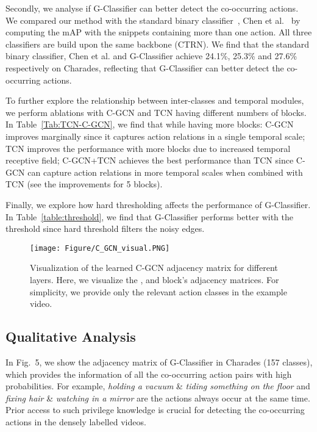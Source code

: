 \documentclass{bmvc2k}
\begin{document}
{Secondly, we analyse if G-Classifier can better detect the co-occurring actions. We compared our method with the standard binary classifier~\cite{superevent}, Chen et al.~\cite{chen2019multi} by computing the mAP with the snippets containing more than one action. 
All three classifiers are build upon the same backbone (CTRN). We find that the standard binary classifier, Chen et al. and G-Classifier achieve 24.1\%, 25.3\% and 27.6\% respectively on Charades, reflecting that G-Classifier can better detect the co-occurring actions.}

To further explore the relationship between inter-classes and temporal modules, we perform ablations with C-GCN and TCN having different numbers of blocks. In Table~\ref{Tab:TCN-C-GCN}, we find that while having more blocks: C-GCN improves marginally since it captures action relations in a single temporal scale; TCN improves the performance with more blocks due to increased temporal receptive field; C-GCN+TCN achieves the best performance than TCN since C-GCN can capture action relations in more temporal scales when combined with TCN (see the improvements for 5 blocks). 

Finally, we explore how hard thresholding affects the performance of G-Classifier. In Table~\ref{table:threshold}, we find that G-Classifier performs better with the threshold since hard threshold filters the noisy edges. 








\begin{figure}[t]
\vspace{1mm}
\texttt{[image: Figure/C\_GCN\_visual.PNG]}
\caption{Visualization of the learned C-GCN adjacency matrix  for different layers. Here, we visualize the ,  and  block's adjacency matrices. For simplicity, we provide only the relevant action classes in the example video. }
\label{Fig:cgcn_visualization}
\end{figure}

\subsection{Qualitative Analysis}
In Fig.~{\color{red}5}, we show the adjacency matrix of G-Classifier in Charades (157 classes), which provides the information of all the co-occurring action pairs with high probabilities.
For example, \textit{holding a vacuum} \& \textit{tiding something on the floor} and \textit{fixing hair} \& \textit{watching in a mirror} are the actions always occur at the same time.
Prior access to such privilege knowledge is crucial for detecting the co-occurring actions in the densely labelled videos.
\end{document}
